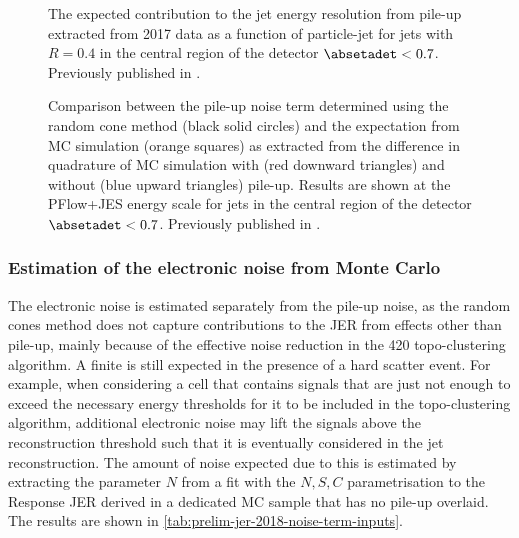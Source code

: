 \begin{figure}[t]
    \caption[The expected contribution to the JER from pile-up.]{The expected contribution to the jet energy resolution from pile-up extracted from 2017 data as a function of particle-jet \pT for \antikt jets with $R = 0.4$ in the central region of the detector $\absetadet < 0.7$. Previously published in .}
    \label{fig:pile-up-jer-vs-pt}
\end{figure}



\begin{figure}[t]
    \caption[Comparison between the pile-up noise term and the expectation from MC simulation.]{Comparison between the pile-up noise term \Npileup determined using the random cone method (black solid circles) and the expectation from MC simulation (orange squares) as extracted from the difference in quadrature of MC simulation with (red downward triangles) and without (blue upward triangles) pile-up. Results are shown at the PFlow+JES energy scale for jets in the central region of the detector $\absetadet < 0.7$. Previously published in .}
    \label{fig:non-closure}
\end{figure}



\subsubsection{Estimation of the electronic noise from Monte Carlo}
\label{subsec:electronic-noise-extraction}
The electronic noise is estimated separately from the pile-up noise, as the random cones method does not capture contributions to the JER from effects other than pile-up, mainly because of the effective noise reduction in the 420 topo-clustering algorithm.
A finite \Nmuzero is still expected in the presence of a hard scatter event.
For example, when considering a cell that contains signals that are just not enough to exceed the necessary energy thresholds for it to be included in the topo-clustering algorithm, additional electronic noise may lift the signals above the reconstruction threshold such that it is eventually considered in the jet reconstruction.
The amount of noise expected due to this is estimated by extracting the parameter $N$ from a fit with the $N, S, C$ parametrisation to the Response JER derived in a dedicated MC sample that has no pile-up overlaid.
The results are shown in \cref{tab:prelim-jer-2018-noise-term-inputs}.


